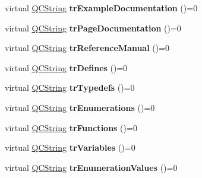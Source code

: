 \begin{DoxyCompactItemize}
\item 
\hypertarget{class_translator_a5dcd231e2337f995446812409978e647}{virtual \hyperlink{class_q_c_string}{Q\-C\-String} {\bfseries tr\-Example\-Documentation} ()=0}\label{class_translator_a5dcd231e2337f995446812409978e647}

\item 
\hypertarget{class_translator_a14cf5e21b6407a438a4c74bb85c22afd}{virtual \hyperlink{class_q_c_string}{Q\-C\-String} {\bfseries tr\-Page\-Documentation} ()=0}\label{class_translator_a14cf5e21b6407a438a4c74bb85c22afd}

\item 
\hypertarget{class_translator_a9135f98c43efad97dee141b5a2242f08}{virtual \hyperlink{class_q_c_string}{Q\-C\-String} {\bfseries tr\-Reference\-Manual} ()=0}\label{class_translator_a9135f98c43efad97dee141b5a2242f08}

\item 
\hypertarget{class_translator_ac68037f451244aa6cef414813b141329}{virtual \hyperlink{class_q_c_string}{Q\-C\-String} {\bfseries tr\-Defines} ()=0}\label{class_translator_ac68037f451244aa6cef414813b141329}

\item 
\hypertarget{class_translator_ac176acbd516074e1cf73f971ece1d7a3}{virtual \hyperlink{class_q_c_string}{Q\-C\-String} {\bfseries tr\-Typedefs} ()=0}\label{class_translator_ac176acbd516074e1cf73f971ece1d7a3}

\item 
\hypertarget{class_translator_a118f069f9b8940cc738ea20f700b8b91}{virtual \hyperlink{class_q_c_string}{Q\-C\-String} {\bfseries tr\-Enumerations} ()=0}\label{class_translator_a118f069f9b8940cc738ea20f700b8b91}

\item 
\hypertarget{class_translator_a8728b77e1af602358833b02bf7998d21}{virtual \hyperlink{class_q_c_string}{Q\-C\-String} {\bfseries tr\-Functions} ()=0}\label{class_translator_a8728b77e1af602358833b02bf7998d21}

\item 
\hypertarget{class_translator_a935a8a3fdbba61a50742f980eccb8d46}{virtual \hyperlink{class_q_c_string}{Q\-C\-String} {\bfseries tr\-Variables} ()=0}\label{class_translator_a935a8a3fdbba61a50742f980eccb8d46}

\item 
\hypertarget{class_translator_a46680488a1c8f807e32ea8159bf2814f}{virtual \hyperlink{class_q_c_string}{Q\-C\-String} {\bfseries tr\-Enumeration\-Values} ()=0}\label{class_translator_a46680488a1c8f807e32ea8159bf2814f}


\end{DoxyCompactItemize}
